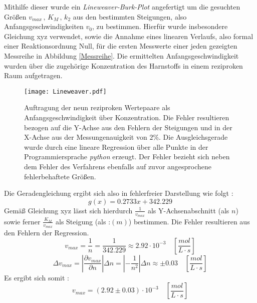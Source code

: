 Mithilfe dieser wurde ein \textit{Lineweaver-Burk-Plot} angefertigt um die gesuchten Größen $v_{max}\, , \, K_M\, ,\, k_2$ aus den bestimmten Steigungen, also Anfangsgeschwindigkeiten $v_0$, zu bestimmen. Hierfür wurde insbesondere Gleichung xyz verwendet, sowie die Annahme eines linearen Verlaufs, also formal einer Reaktionsordnung Null, für die ersten Messwerte einer jeden gezeigten Messreihe in Abbildung \ref{Messreihe}. Die ermittelten Anfangsgeschwindigkeit wurden über die zugehörige Konzentration des Harnstoffs in einem reziproken Raum aufgetragen.
\begin{figure}[H]
	\centering	
	\begin{minipage}{1\textwidth}
		\texttt{[image: Lineweaver.pdf]}
	\end{minipage}
	\caption{Auftragung der neun reziproken Wertepaare als Anfangsgeschwindigkeit über Konzentration. Die Fehler resultieren bezogen auf die Y-Achse aus den Fehlern der Steigungen und in der X-Achse aus der Messungenauigkeit von $2\%$. Die Ausgleichsgerade wurde durch eine lineare Regression über alle Punkte in der Programmiersprache \textit{python} erzeugt. Der Fehler bezieht sich neben dem Fehler des Verfahrens ebenfalls auf zuvor angesprochene fehlerbehaftete Größen.}
	\label{Lineweaver}
\end{figure}
Die Geradengleichung ergibt sich also in fehlerfreier Darstellung wie folgt : 
\begin{equation}
g(x) = 0.2733 x + 342.229
\label{Geradengleichung}
\end{equation}
Gemäß Gleichung xyz lässt sich hierdurch $\frac{1}{v_{max}}$ als Y-Achsenabschnitt (als $n$) sowie ferner $\frac{K_M}{v_{max}}$ als Steigung (als :$(m)$) bestimmen. Die Fehler resultieren aus den Fehlern der Regression.\\
\begin{equation}
v_{max} = \frac{1}{n} = \frac{1}{342.229} \approx 2.92\cdot 10^{-3} \quad \left[\si{\frac{mol}{L\cdot s}}\right]
\end{equation}
\begin{equation}
\Delta v_{max} = |\frac{\partial v_{max}}{\partial n}|\Delta n = |-\frac{1}{n^2}|\Delta n \approx \pm 0.03  \quad \left[\si{\frac{mol}{L\cdot s}}\right]
\end{equation}
Es ergibt sich somit : 
\begin{equation}
v_{max} = (2.92 \pm 0.03 )\cdot 10^{-3}  \quad \left[\si{\frac{mol}{L\cdot s}}\right]
\end{equation}\\
